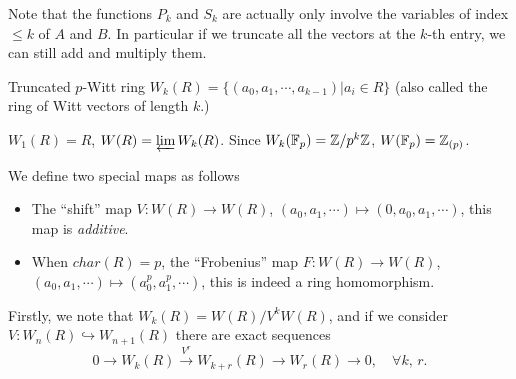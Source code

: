 Note that the functions $P_k$ and $S_k$ are actually only involve the variables of index $\leqslant k$ of $A$ and $B$. In particular if we truncate all the vectors at the $k$-th entry, we can still add and multiply them.
\begin{definition}
Truncated $p$-Witt ring $W_k(R)=\{(a_0,a_1,\cdots,a_{k-1})| a_i\in R\}$ (also called the ring of Witt vectors of length $k$.)
\end{definition}
\begin{example}
	$W_1(R)=R$, $W(R)=\varprojlim W_k(R)$. Since $W_k(\mathbb{F}_p)=\mathbb{Z}/p^k\mathbb{Z}$, $W(\mathbb{F}_p)=\mathbb{Z}_{(p)}$.
\end{example}
	
\begin{definition}
We define two special maps as follows
\begin{itemize}
	\item The ``shift'' map $V\colon W(R)\longrightarrow W(R)$, $(a_0,a_1,\cdots) \mapsto (0,a_0,a_1,\cdots)$, this map is {\em additive}.
	\item When $char(R)=p$, the ``Frobenius'' map $F\colon W(R)\longrightarrow W(R)$, $(a_0,a_1,\cdots) \mapsto (a_0^p,a_1^p,\cdots)$, this is indeed a ring homomorphism.
\end{itemize}
\end{definition}
Firstly, we note that $W_k(R)=W(R)/V^kW(R)$, and if we consider $V\colon W_n(R)\hookrightarrow W_{n+1}(R)$ there are exact sequences
\[0\longrightarrow W_k(R)\overset{V^r}\longrightarrow W_{k+r}(R)\longrightarrow W_r(R) \longrightarrow 0, \quad \forall k,\,r.\]

